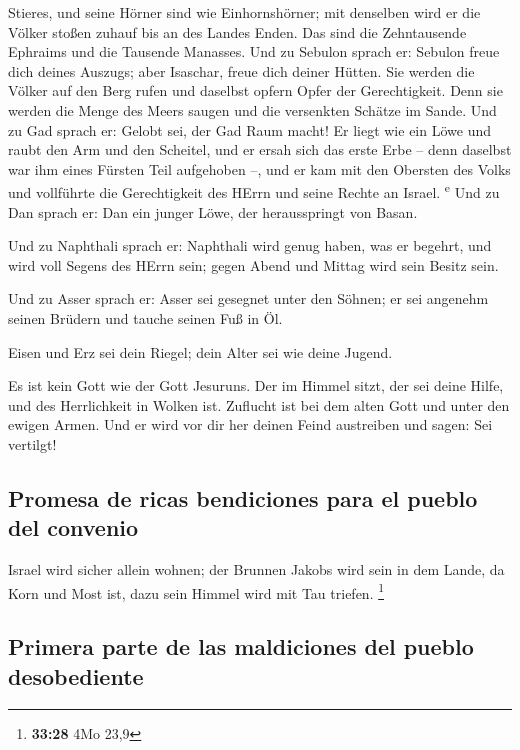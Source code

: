 Stieres, und seine Hörner sind wie Einhornshörner; mit denselben wird er
die Völker stoßen zuhauf bis an des Landes Enden. Das sind die
Zehntausende Ephraims und die Tausende Manasses.  Und zu
Sebulon sprach er: Sebulon freue dich deines Auszugs; aber Isaschar,
freue dich deiner Hütten.  Sie werden die Völker auf den
Berg rufen und daselbst opfern Opfer der Gerechtigkeit. Denn sie werden
die Menge des Meers saugen und die versenkten Schätze im Sande.
 Und zu Gad sprach er: Gelobt sei, der Gad Raum macht! Er
liegt wie ein Löwe und raubt den Arm und den Scheitel, 
und er ersah sich das erste Erbe -- denn daselbst war ihm eines Fürsten
Teil aufgehoben --, und er kam mit den Obersten des Volks und vollführte
die Gerechtigkeit des HErrn und seine Rechte an Israel.
\textsuperscript{e}  Und zu Dan sprach er: Dan ein junger
Löwe, der herausspringt von Basan.

 Und zu Naphthali sprach er: Naphthali wird genug haben,
was er begehrt, und wird voll Segens des HErrn sein; gegen Abend und
Mittag wird sein Besitz sein.

 Und zu Asser sprach er: Asser sei gesegnet unter den
Söhnen; er sei angenehm seinen Brüdern und tauche seinen Fuß in Öl.

 Eisen und Erz sei dein Riegel; dein Alter sei wie deine
Jugend.

 Es ist kein Gott wie der Gott Jesuruns. Der im Himmel
sitzt, der sei deine Hilfe, und des Herrlichkeit in Wolken ist.
 Zuflucht ist bei dem alten Gott und unter den ewigen
Armen. Und er wird vor dir her deinen Feind austreiben und sagen: Sei
vertilgt!

\hypertarget{promesa-de-ricas-bendiciones-para-el-pueblo-del-convenio}{%
\subsection{Promesa de ricas bendiciones para el pueblo del
convenio}\label{promesa-de-ricas-bendiciones-para-el-pueblo-del-convenio}}

 Israel wird sicher allein wohnen; der Brunnen Jakobs
wird sein in dem Lande, da Korn und Most ist, dazu sein Himmel wird mit
Tau triefen. \footnote{\textbf{33:28} 4Mo 23,9}

\hypertarget{primera-parte-de-las-maldiciones-del-pueblo-desobediente}{%
\subsection{Primera parte de las maldiciones del pueblo
desobediente}\label{primera-parte-de-las-maldiciones-del-pueblo-desobediente}}

